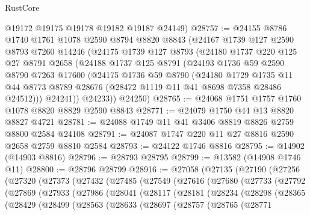 \begin{lexlean}{RustCore}
\begin{coremodule}
      @19172
      @19175
      @19178
      @19182
      @19187
      @24149)
@28757 := @24155
    @8786
    @1740
    @1761
    @1078
    @2590
    @8794
    @8820
    @8843
    (@24167
      @1739
      @127
      @2590
      @8793
      @7260
      @14246
      (@24175
        @1739
        @127
        @8793
        (@24180
          @1737
          @220
          @125
          @27
          @8791
          @2658
          (@24188
            @1737
            @125
            @8791
            (@24193
              @1736
              @59
              @2590
              @8790
              @7263
              @17600
              (@24175
                @1736
                @59
                @8790
                (@24180
                  @1729
                  @1735
                  @11
                  @44
                  @8773
                  @8789
                  @28676
                  (@28472 @1119 @11 @41 @8698 @7358 @28486 @24512)))
              @24241))
          @24233))
      @24250)
@28765 := @24068 @1751 @1757 @1760 @1078 @8820 @8829 @2590 @8843
@28771 := @24079 @1750 @44 @13 @8820 @8827 @4721
@28781 := @24088 @1749 @11 @41 @3406 @8819 @8826 @2759 @8800 @2584 @24108
@28791 := @24087 @1747 @220 @11 @27 @8816 @2590 @2658 @2759 @8810 @2584
@28793 := @24122 @1746 @8816
@28795 := @14902 (@14903 @8816)
@28796 := @28793 @28795
@28799 := @13582 (@14908 @1746 @11)
@28800 := @28796 @28799
@28916 := @27058
    (@27135
      (@27190
        (@27256
          (@27320
            (@27373
              (@27432
                (@27485
                  (@27549
                    (@27616
                      (@27680
                        (@27733
                          (@27792
                            (@27869
                              (@27933
                                (@27986
                                  (@28041
                                    (@28117
                                      (@28181
                                        (@28234
                                          (@28298
                                            (@28365
                                              (@28429
                                                (@28499
                                                  (@28563
                                                    (@28633
                                                      (@28697
                                                        (@28757
                                                          (@28765
                                                            (@28771

\end{coremodule}
\end{lexlean}
